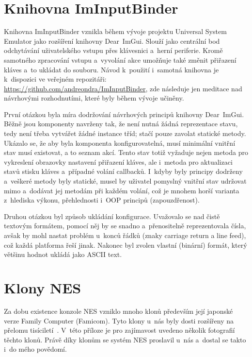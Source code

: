 \chapter{Knihovna ImInputBinder}
\label{apx:binder}

Knihovna ImInputBinder vznikla během vývoje projektu Universal System Emulator jako rozšíření knihovny Dear~ImGui. Slouží jako centrální bod odchytávání uživatelského vstupu přes klávesnici a~herní periferie. Kromě samotného zpracování vstupu a~vyvolání akce umožňuje také změnit přiřazení kláves a~to ukládat do souboru. Návod k~použití i~samotná knihovna je k~dispozici ve veřejném repozitáři: \url{https://github.com/andreondra/ImInputBinder}, zde následuje jen meditace nad návrhovými rozhodnutími, které byly během vývoje učiněny.

První otázkou byla míra dodržování návrhových principů knihovny Dear~ImGui. Běžně jsou komponenty navrženy tak, že není nutná žádná reprezentace stavu, tedy není třeba vytvářet žádné instance tříd; stačí pouze zavolat statické metody. Ukázalo se, že aby byla komponenta konfigurovatelná, musí minimální vnitřní stav musí existovat, a to seznam akcí. Tento stav totiž vyžaduje nejen metoda pro vykreslení obrazovky nastavení přiřazení kláves, ale i~metoda pro aktualizaci stavů stisku kláves a~případné volání callbacků. I~kdyby byly principy dodrženy a~veškeré metody byly statické, musel by uživatel pomyslný vnitřní stav udržovat mimo a~dodávat jej metodám při každém volání, což je mnohem horší varianta z~hlediska výkonu, přehlednosti i~OOP principů (zapouzdřenost).

Druhou otázkou byl způsob ukládání konfigurace. Uvažovalo se nad čistě textovým formátem, pomocí něj by se snadno a~přenositelně reprezentovala čísla, avšak by mohl nastat problém u~konců řádků (znaky carriage return a line feed), což každá platforma řeší jinak. Nakonec byl zvolen vlastní (binární) formát, který většinu hodnot ukládá jako ASCII text.

\chapter{Klony NES}
\label{apx:klony-nes}
Za dobu existence konzole NES vzniklo mnoho klonů především její japonské verze Family Computer (Famicom). Tyto klony u~nás byly dosti rozšířeny na přelomu tisíciletí~\cite{Svara:polystation}. V~této příloze je pro zajímavost uvedeno několik fotografií těchto klonů. Právě díky klonům se systém NES proslavil u~nás a~dostal se takto i~do mého povědomí.

